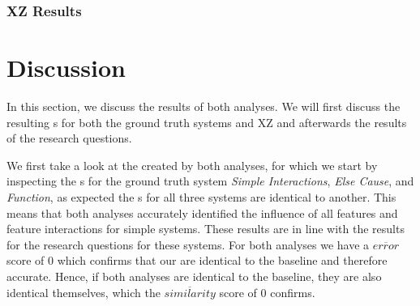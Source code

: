 \subsubsection*{XZ Results}

\section{Discussion}\label{sec:discussion}

In this section, we discuss the results of both analyses. We will first discuss the resulting {\perfInfluenceModel}s 
for both the ground truth systems and \textsc{XZ} and afterwards the results of the research questions.

We first take a look at the {\perfInfluenceModel} created by both analyses, 
for which we start by inspecting the {\perfInfluenceModel}s for the ground truth system \emph{Simple Interactions}, 
\emph{Else Cause}, and \emph{Function}, as expected the {\perfInfluenceModel}s for all three systems are identical to another. 
This means that both analyses accurately identified the influence of all features and feature interactions for simple systems.
These results are in line with the results for the research questions for these systems. For both analyses
we have a $\overline{error}$ score of $0$ which confirms that our {\perfInfluenceModel} are identical to the baseline and therefore 
accurate. Hence, if both analyses {\perfInfluenceModel} are identical to the baseline, they are also identical themselves,
which the $\overline{similarity}$ score of $0$ confirms.


